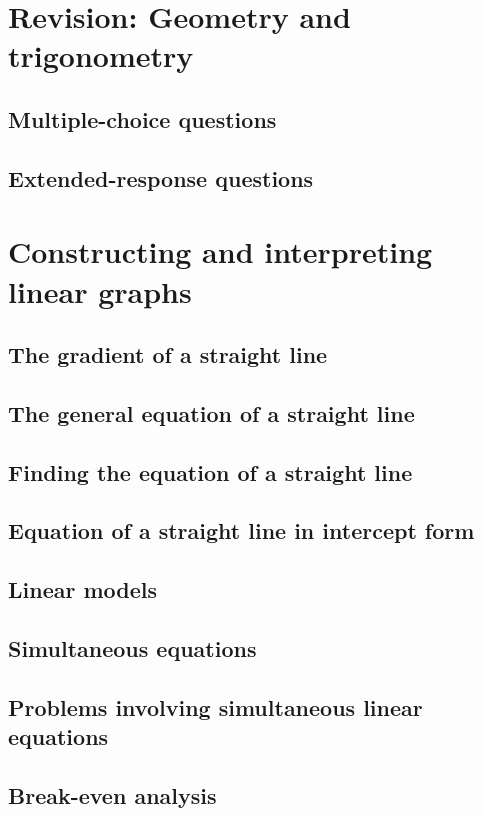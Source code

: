 \documentclass[a4paper,11pt]{article}
\begin{document}
\section{Revision: Geometry and trigonometry}
\begin{outline}

\0
\subsection{Multiple-choice questions}

\0
\subsection{Extended-response questions}

\end{outline}

\newpage

\section{Constructing and interpreting linear graphs}
\begin{outline}

\0
\subsection{The gradient of a straight line}

\0
\subsection{The general equation of a straight line}

\0
\subsection{Finding the equation of a straight line}

\0
\subsection{Equation of a straight line in intercept form}

\0
\subsection{Linear models}

\0
\subsection{Simultaneous equations}

\0
\subsection{Problems involving simultaneous linear equations}

\0
\subsection{Break-even analysis}

\end{outline}
\end{document}
